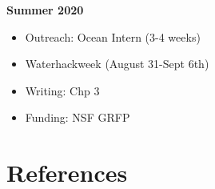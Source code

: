 \documentclass[12pt, letterpaper, twoside]{article}
\begin{document}
\textbf{Summer 2020}
\begin{itemize}
	\item Outreach: Ocean Intern (3-4 weeks)
	\item Waterhackweek (August 31-Sept 6th)
	\item Writing: Chp 3 
	\item Funding: NSF GRFP
\end{itemize}




\newpage

\section{References}

\printbibliography[heading=none]
\end{document}

